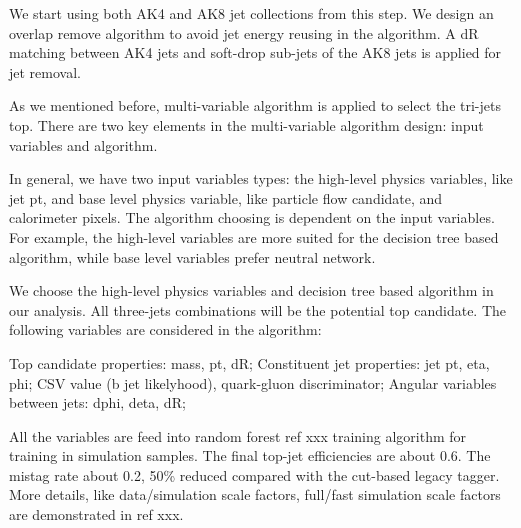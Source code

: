 We start using both AK4 and AK8 jet collections from this step. We design an overlap remove algorithm to avoid jet energy reusing in the algorithm. A dR matching between AK4 jets and soft-drop sub-jets of the AK8 jets is applied for jet removal. 

As we mentioned before, multi-variable algorithm is applied to select the tri-jets top. There are two key elements in the multi-variable algorithm design: input variables and algorithm. 

In general, we have two input variables types: the high-level physics variables, like jet pt, and base level physics variable, like particle flow candidate, and calorimeter pixels. The algorithm choosing is dependent on the input variables. For example, the high-level variables are more suited for the decision tree based algorithm, while base level variables prefer neutral network. 

We choose the high-level physics variables and decision tree based algorithm in our analysis. All three-jets combinations will be the potential top candidate. The following variables are considered in the algorithm: 

Top candidate properties: mass, pt, dR;
Constituent jet properties: jet pt, eta, phi; CSV value (b jet likelyhood), quark-gluon discriminator;
Angular variables between jets: dphi, deta, dR;


All the variables are feed into random forest ref xxx training algorithm for training in simulation samples. The final top-jet efficiencies are about 0.6. The mistag rate about 0.2, 50\% reduced compared with the cut-based legacy tagger. More details, like data/simulation scale factors, full/fast simulation scale factors are demonstrated in ref xxx. 

